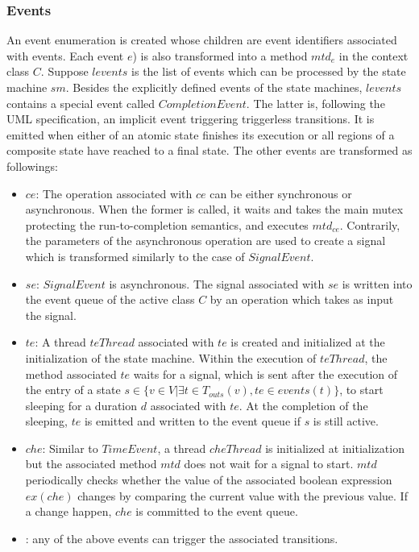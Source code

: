 \subsubsection{Events}
An event enumeration  is created whose children are event identifiers associated with events. Each event $e$) is also transformed into a method $mtd_e$ in the context class $C$. Suppose $levents$ is the list of events which can be processed by the state machine $sm$. Besides the explicitly defined events of the state machines, $levents$ contains a special event called $CompletionEvent$. The latter is, following the UML specification, an implicit event triggering triggerless transitions. It is emitted when either  of an atomic state finishes its execution or all regions of a composite state have reached to a final state. The other events are transformed as followings:

\begin{itemize}
	\item {} $ce$: The operation associated with $ce$ can be either synchronous or asynchronous. When the former is called, it waits and takes the main mutex protecting the run-to-completion semantics, and executes $mtd_{ce}$. Contrarily, the parameters of the asynchronous operation are used to create a signal which is transformed similarly to the case of $SignalEvent$.
	
	\item {} $se$: $SignalEvent$ is asynchronous. 
	The signal associated with $se$ is written into the event queue of the active class $C$ by an operation which takes as input the signal. 
	
	\item {} $te$: A thread $teThread$ associated with $te$ is created and initialized at the initialization of the state machine. 
	Within the execution of $teThread$, the method associated $te$ waits for a signal, which is sent after the execution of the entry of a state $s \in \{v \in V|\exists t \in T_{outs}(v), te \in events(t)\}$, to start sleeping for a duration $d$ associated with $te$. 
	At the completion of the sleeping, $te$ is emitted and written to the event queue if $s$ is still active.
	
	\item {} $che$: Similar to $TimeEvent$, a thread $cheThread$ is initialized at initialization but the associated method $mtd$ does not wait for a signal to start. $mtd$ periodically checks whether the value of the associated boolean expression $ex(che)$ changes by comparing the current value with the previous value. 
	If a change happen, $che$ is committed to the event queue.
	
	\item {}: any of the above events can trigger the associated transitions.
\end{itemize}


